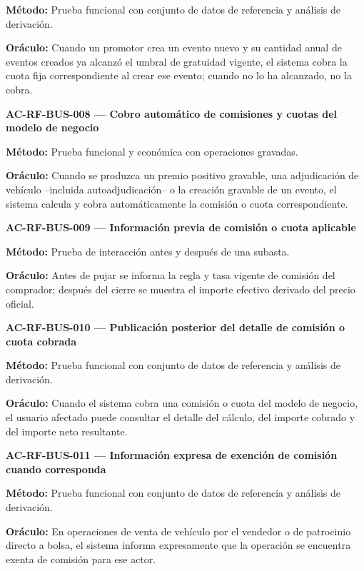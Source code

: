 \documentclass[10pt,letterpaper]{article}
\begin{document}
\textbf{Método:} Prueba funcional con conjunto de datos de referencia y análisis de derivación.\par
\textbf{Oráculo:} Cuando un promotor crea un evento nuevo y su cantidad anual de eventos creados ya alcanzó el umbral de gratuidad vigente, el sistema cobra la cuota fija correspondiente al crear ese evento; cuando no lo ha alcanzado, no la cobra.\par\vspace{0.45em}
\noindent\textbf{AC-RF-BUS-008 --- Cobro automático de comisiones y cuotas del modelo de negocio}\par
\textbf{Método:} Prueba funcional y económica con operaciones gravadas.\par
\textbf{Oráculo:} Cuando se produzca un premio positivo gravable, una adjudicación de vehículo --incluida autoadjudicación-- o la creación gravable de un evento, el sistema calcula y cobra automáticamente la comisión o cuota correspondiente.\par\vspace{0.45em}
\noindent\textbf{AC-RF-BUS-009 --- Información previa de comisión o cuota aplicable}\par
\textbf{Método:} Prueba de interacción antes y después de una subasta.\par
\textbf{Oráculo:} Antes de pujar se informa la regla y tasa vigente de comisión del comprador; después del cierre se muestra el importe efectivo derivado del precio oficial.\par\vspace{0.45em}
\noindent\textbf{AC-RF-BUS-010 --- Publicación posterior del detalle de comisión o cuota cobrada}\par
\textbf{Método:} Prueba funcional con conjunto de datos de referencia y análisis de derivación.\par
\textbf{Oráculo:} Cuando el sistema cobra una comisión o cuota del modelo de negocio, el usuario afectado puede consultar el detalle del cálculo, del importe cobrado y del importe neto resultante.\par\vspace{0.45em}
\noindent\textbf{AC-RF-BUS-011 --- Información expresa de exención de comisión cuando corresponda}\par
\textbf{Método:} Prueba funcional con conjunto de datos de referencia y análisis de derivación.\par
\textbf{Oráculo:} En operaciones de venta de vehículo por el vendedor o de patrocinio directo a bolsa, el sistema informa expresamente que la operación se encuentra exenta de comisión para ese actor.\par\vspace{0.45em}
\end{document}
